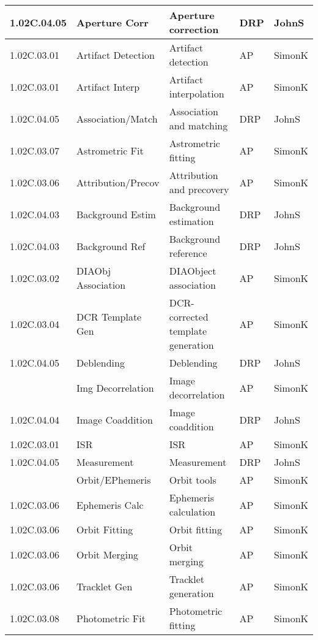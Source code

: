 \begin{longtable}{|p{}|p{}|p{}|p{}|p{}|}
{\tiny 1.02C.04.05} & \small Aperture Corr & Aperture correction & DRP & JohnS\\ \hline 
{\tiny 1.02C.03.01} & \small Artifact Detection & Artifact detection & AP & SimonK\\ \hline 
{\tiny 1.02C.03.01} & \small Artifact Interp & Artifact interpolation & AP & SimonK\\ \hline 
{\tiny 1.02C.04.05} & \small Association/Match & Association and matching & DRP & JohnS\\ \hline 
{\tiny 1.02C.03.07} & \small Astrometric Fit & Astrometric fitting & AP & SimonK\\ \hline 
{\tiny 1.02C.03.06} & \small Attribution/Precov & Attribution and precovery & AP & SimonK\\ \hline 
{\tiny 1.02C.04.03} & \small Background Estim & Background estimation & DRP & JohnS\\ \hline 
{\tiny 1.02C.04.03} & \small Background Ref & Background reference & DRP & JohnS\\ \hline 
{\tiny 1.02C.03.02} & \small DIAObj Association & DIAObject association & AP & SimonK\\ \hline 
{\tiny 1.02C.03.04} & \small DCR Template Gen & DCR-corrected template generation & AP & SimonK\\ \hline 
{\tiny 1.02C.04.05} & \small Deblending & Deblending & DRP & JohnS\\ \hline 
{\tiny } & \small Img Decorrelation & Image decorrelation & AP & SimonK\\ \hline 
{\tiny 1.02C.04.04} & \small Image Coaddition & Image coaddition & DRP & JohnS\\ \hline 
{\tiny 1.02C.03.01} & \small ISR & ISR & AP & SimonK\\ \hline 
{\tiny 1.02C.04.05} & \small Measurement & Measurement & DRP & JohnS\\ \hline 
{\tiny } & \small Orbit/EPhemeris & Orbit tools & AP & SimonK\\ \hline 
{\tiny 1.02C.03.06} & \small Ephemeris Calc & Ephemeris calculation & AP & SimonK\\ \hline 
{\tiny 1.02C.03.06} & \small Orbit Fitting & Orbit fitting & AP & SimonK\\ \hline 
{\tiny 1.02C.03.06} & \small Orbit Merging & Orbit merging & AP & SimonK\\ \hline 
{\tiny 1.02C.03.06} & \small Tracklet Gen & Tracklet generation & AP & SimonK\\ \hline 
{\tiny 1.02C.03.08} & \small Photometric Fit & Photometric fitting & AP & SimonK\\ \hline 

\end{longtable}
